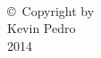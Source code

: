 
\thispagestyle{empty}
\hbox{\ }

\vfill
\renewcommand{\baselinestretch}{1}
\small\normalsize

\vspace{-.65in}

\begin{center}
\large{\copyright \hbox{ }Copyright by\\
Kevin Pedro  %
\\
2014}
\end{center}

\vfill
